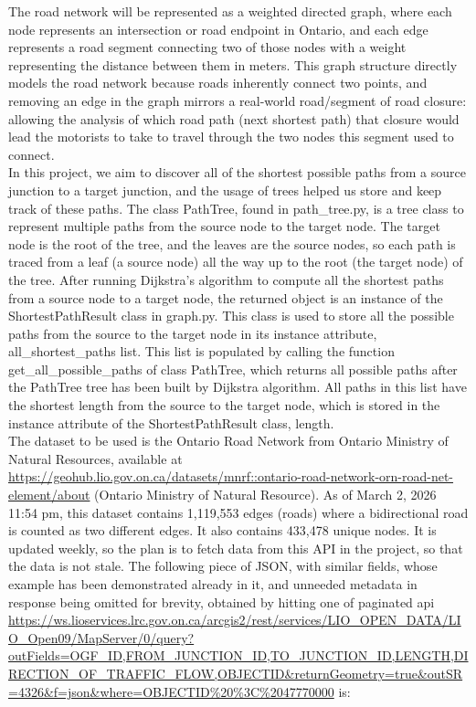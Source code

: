 \documentclass[fontsize=11pt]{article}
\begin{document}
The road network will be represented as a weighted directed graph, where each node represents an intersection or road endpoint in Ontario, and each edge represents a road segment connecting two of those nodes with a weight representing the distance between them in meters. This graph structure directly models the road network because roads inherently connect two points, and removing an edge in the graph mirrors a real-world road/segment of road closure: allowing the analysis of which road path (next shortest path) that closure would lead the motorists to take to travel through the two nodes this segment used to connect. \\

In this project, we aim to discover all of the shortest possible paths from a source junction to a target junction, and the usage of trees helped us store and keep track of these paths. The class PathTree, found in path\_tree.py,  is a tree class to represent multiple paths from the source node to the target node. The target node is the root of the tree, and the leaves are the source nodes, so each path is traced from a leaf (a source node) all the way up to the root (the target node) of the tree. After running Dijkstra’s algorithm to compute all the shortest paths from a source node to a target node, the returned object is an instance of the ShortestPathResult class in graph.py. This class is used to store all the possible paths from the source to the target node in its instance attribute, all\_shortest\_paths list. This list is populated by calling the function get\_all\_possible\_paths of class PathTree, which returns all possible paths after the PathTree tree has been built by Dijkstra algorithm. All paths in this list have the shortest length from the source to the target node, which is stored in the instance attribute of the ShortestPathResult class, length. \\

The dataset to be used is the Ontario Road Network from Ontario Ministry of Natural Resources, available at \url{https://geohub.lio.gov.on.ca/datasets/mnrf::ontario-road-network-orn-road-net-element/about} (Ontario Ministry of Natural Resource). As of March 2, 2026 11:54 pm, this dataset contains 1,119,553 edges (roads) where a bidirectional road is counted as two different edges. It also contains 433,478 unique nodes. It is updated weekly, so the plan is to fetch data from this API in the project, so that the data is not stale.
The following piece of JSON, with similar fields, whose example has been demonstrated already in it, and unneeded metadata in response being omitted for brevity, obtained by hitting one of paginated api \url{https://ws.lioservices.lrc.gov.on.ca/arcgis2/rest/services/LIO_OPEN_DATA/LIO_Open09/MapServer/0/query?outFields=OGF_ID,FROM_JUNCTION_ID,TO_JUNCTION_ID,LENGTH,DIRECTION_OF_TRAFFIC_FLOW,OBJECTID&returnGeometry=true&outSR=4326&f=json&where=OBJECTID%20%3C%2047770000} is:
\end{document}
